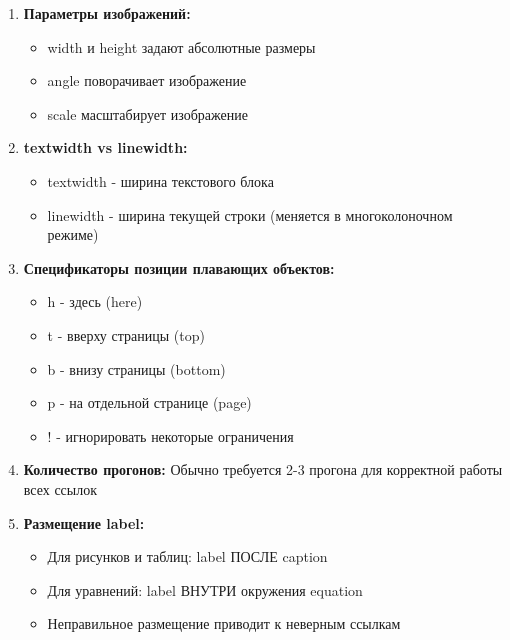 \documentclass[12pt]{article}
\begin{document}
\begin{enumerate}
    \item \textbf{Параметры изображений:}
    \begin{itemize}
        \item width и height задают абсолютные размеры
        \item angle поворачивает изображение
        \item scale масштабирует изображение
    \end{itemize}
    
    \item \textbf{textwidth vs linewidth:}
    \begin{itemize}
        \item textwidth - ширина текстового блока
        \item linewidth - ширина текущей строки (меняется в многоколоночном режиме)
    \end{itemize}
    
    \item \textbf{Спецификаторы позиции плавающих объектов:}
    \begin{itemize}
        \item h - здесь (here)
        \item t - вверху страницы (top)
        \item b - внизу страницы (bottom)
        \item p - на отдельной странице (page)
        \item ! - игнорировать некоторые ограничения
    \end{itemize}
    
    \item \textbf{Количество прогонов:} Обычно требуется 2-3 прогона для корректной работы всех ссылок
    
    \item \textbf{Размещение label:}
    \begin{itemize}
        \item Для рисунков и таблиц: label ПОСЛЕ caption
        \item Для уравнений: label ВНУТРИ окружения equation
        \item Неправильное размещение приводит к неверным ссылкам
    \end{itemize}
\end{enumerate}

\lipsum[17]
\end{document}
